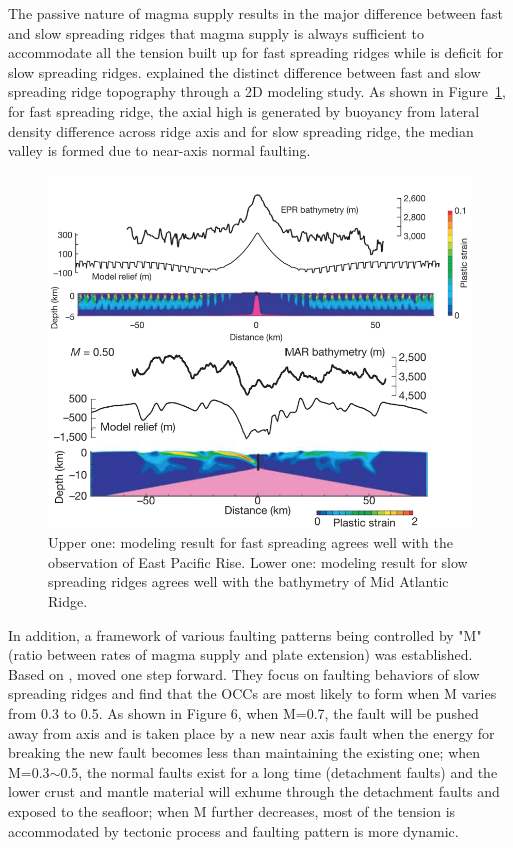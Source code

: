 \documentclass[12pt]{article}
\begin{document}
The passive nature of magma supply results in the major difference between fast and slow spreading ridges that magma supply is always sufficient to accommodate all the tension built up for fast spreading ridges while is deficit for slow spreading ridges. \citep{Buck2005} explained the distinct difference between fast and slow spreading ridge topography through a 2D modeling study. As shown in Figure~\ref{fig5_1}, for fast spreading ridge, the axial high is generated by buoyancy from lateral density difference across ridge axis and for slow spreading ridge, the median valley is formed due to near-axis normal faulting.
\begin{figure}[H]
 \centering
  \includegraphics[scale=0.7]{fig5_1.png}
 \caption{\small{Upper one: modeling result for fast spreading agrees well with the observation of East Pacific Rise. Lower one: modeling result for slow spreading ridges agrees well with the bathymetry of Mid Atlantic Ridge. \citep{Buck2005}}}
 \label{fig5_1}
\end{figure}
In addition, a framework of various faulting patterns being controlled by "M" (ratio between rates of magma supply and plate extension) was established. Based on \citep{Buck2005}, \citep{Tucholke2008} moved one step forward. They focus on faulting behaviors of slow spreading ridges and find that the OCCs are most likely to form when M varies from 0.3 to 0.5. As shown in Figure 6, when M=0.7, the fault will be pushed away from axis and is taken place by a new near axis fault when the energy for breaking the new fault becomes less than maintaining the existing one; when M=0.3$\sim$0.5, the normal faults exist for a long time (detachment faults) and the lower crust and mantle material will exhume through the detachment faults and exposed to the seafloor; when M further decreases, most of the tension is accommodated by tectonic process and faulting pattern is more dynamic.
\end{document}
